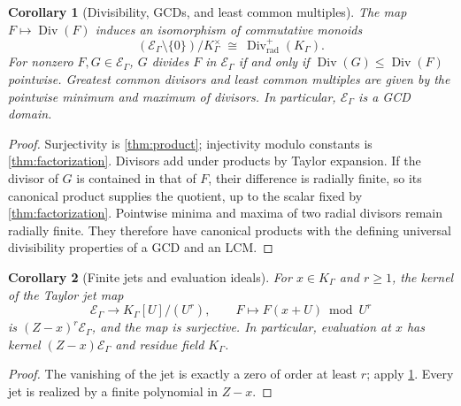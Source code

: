 \documentclass[11pt]{article}
\theoremstyle{plain}
\theoremstyle{plain}
\theoremstyle{plain}
\newtheorem{corollary}[corollary]{Corollary}
\theoremstyle{definition}
\theoremstyle{definition}
\theoremstyle{definition}
\theoremstyle{remark}
\newcommand{\K}{K_\Gamma}\newcommand{\E}{\mathcal E_\Gamma}
\DeclareMathOperator{\Div}{Div}\DeclareMathOperator{\inpol}{in}
\begin{document}
\begin{corollary}[Divisibility, GCDs, and least common multiples]
\label{cor:gcd}
The map $F\mapsto\Div(F)$ induces an isomorphism of commutative monoids
\[
 (\E\setminus\{0\})/\K^\times
 \ \cong\ \Div^+_{\mathrm{rad}}(\K).
\]
For nonzero $F,G\in\E$, $G$ divides $F$ in $\E$ if and only if
$\Div(G)\le\Div(F)$ pointwise. Greatest common divisors and least common
multiples are given by the pointwise minimum and maximum of divisors.
In particular, $\E$ is a GCD domain.
\end{corollary}
\begin{proof}
Surjectivity is \cref{thm:product}; injectivity modulo constants is
\cref{thm:factorization}. Divisors add under products by Taylor
expansion. If the divisor of $G$ is contained in that of $F$, their
difference is radially finite, so its canonical product supplies the
quotient, up to the scalar fixed by \cref{thm:factorization}.
Pointwise minima and maxima of two radial divisors remain radially
finite. They therefore have canonical products with the defining
universal divisibility properties of a GCD and an LCM.
\end{proof}

\begin{corollary}[Finite jets and evaluation ideals]\label{cor:evaluation}
For $x\in\K$ and $r\ge1$, the kernel of the Taylor jet map
\[
 \E\longrightarrow\K[U]/(U^r),\qquad
 F\longmapsto F(x+U)\bmod U^r
\]
is $(Z-x)^r\E$, and the map is surjective. In particular, evaluation
at $x$ has kernel $(Z-x)\E$ and residue field $\K$.
\end{corollary}
\begin{proof}
The vanishing of the jet is exactly a zero of order at least $r$;
apply \cref{cor:gcd}. Every jet is realized by a finite polynomial in
$Z-x$.
\end{proof}
\end{document}
